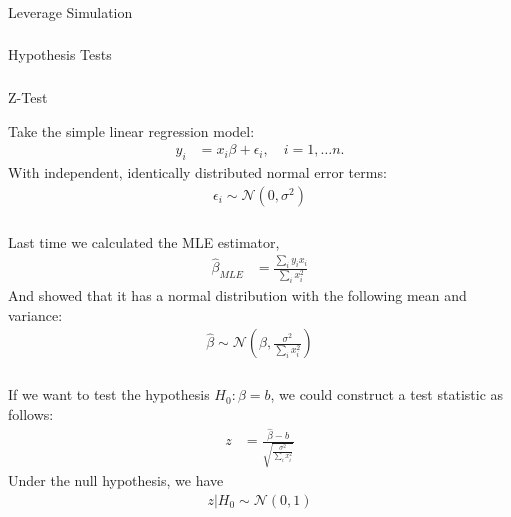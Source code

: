 \begin{frame}[fragile] \frametitle{}

\begin{flushright}
{\color{yaleblue}\sc\fontsize{1cm}{0cm}\selectfont Leverage Simulation}
\end{flushright}

\end{frame}

\begin{frame}[fragile] \frametitle{}

\begin{flushright}
{\color{yaleblue}\sc\fontsize{1cm}{0cm}\selectfont Hypothesis Tests}
\end{flushright}

\end{frame}

\begin{frame}[fragile] \frametitle{}

{\color{yaleblue}\fontsize{16pt}{20pt}\selectfont Z-Test}

Take the simple linear regression model:
\begin{align*}
y_i &=  x_i\beta  + \epsilon_i, \quad i = 1, \ldots n.
\end{align*}
With independent, identically distributed normal error terms:
\begin{align*}
\epsilon_i \sim \mathcal{N}(0, \sigma^2)
\end{align*}

\end{frame}

\begin{frame}[fragile] \frametitle{}

Last time we calculated the MLE estimator,
\begin{align*}
\widehat{\beta}_{MLE} &= \frac{\sum_i y_i x_i}{\sum_i x_i^2}
\end{align*}
\pause And showed that it has a normal distribution with the following
mean and variance:
\begin{align*}
\widehat{\beta} \sim \mathcal{N} (\beta, \frac{\sigma^2}{\sum_i x_i^2})
\end{align*}

\end{frame}

\begin{frame}[fragile] \frametitle{}

If we want to test the hypothesis $H_0: \beta = b$, we
could construct a test statistic as follows: \pause
\begin{align*}
z &= \frac{\widehat{\beta} - b}{\sqrt{\frac{\sigma^2}{\sum_i x_i^2}}}
\end{align*}
\pause Under the null hypothesis, we have
\begin{align*}
z | H_0  \sim \mathcal{N} (0, 1)
\end{align*}

\end{frame}

